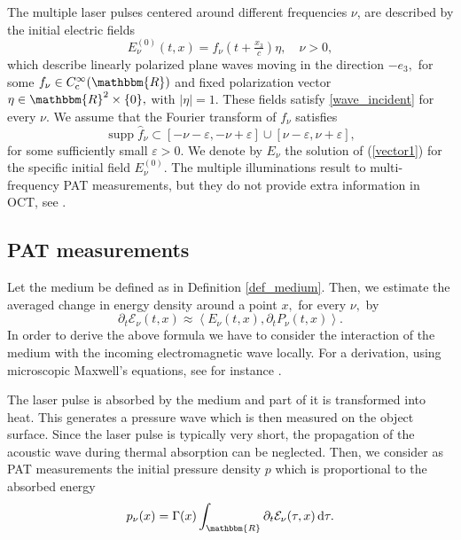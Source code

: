 \documentclass[a4paper,twoside,10pt]{article}
\theoremstyle{break}
\theoremstyle{nonumberplain}
\newcommand{\R}{\mathbbm{R}}
\renewcommand{\d}{\,\mathrm d}
\DeclareMathOperator{\supp}{supp}
\begin{document}
The  multiple laser pulses centered around different frequencies $\nu$, are described by the initial electric fields 
\begin{equation}\label{eqLocalisedPulse1}
E^{(0)}_\nu(t,x)=f_\nu(t+\tfrac{x_3}c)\eta, \quad \nu>0,
\end{equation}
which describe linearly polarized plane waves moving in the direction $-e_3 ,$  for some $f_\nu \in C^\infty_{\mathrm c}(\R)$ and fixed polarization vector $\eta\in\R^2\times\{0\},$ with $\vert\eta \vert =1.$ These fields satisfy \eqref{wave_incident} for every $\nu$.
We assume that the Fourier transform of $f_\nu$ satisfies
\begin{equation}\label{eqLocalisedPulse}
\supp\hat f_\nu\subset[-\nu-\varepsilon,-\nu+\varepsilon]\cup[\nu-\varepsilon,\nu+\varepsilon] ,
\end{equation}
for some sufficiently small $\varepsilon>0$. We denote by $E_\nu$ the solution of (\ref{vector1}) for the specific initial field $E^{(0)}_\nu .$
The multiple illuminations result to multi-frequency PAT measurements, but they do not provide extra information in OCT, see \cite[Lemma 3.6]{ElbMinSch17}. 


\subsection{PAT measurements}

Let the medium be defined as in Definition \ref{def_medium}. 
Then, we estimate the averaged change in energy density around a point $x,$ for every $\nu,$ by 
\begin{equation}\label{eqAbsorbedEnergy}
\partial_t\mathcal E_\nu (t,x) \approx \left<E_\nu(t,x),\partial_t  P_\nu (t,x)\right>.
\end{equation}
In order to derive the above formula we have to consider the interaction of the medium with the incoming electromagnetic wave locally. For a derivation, using microscopic Maxwell's equations, see for instance \cite[Section 4]{ElbMinSch17}.

The laser pulse is absorbed by the medium and part of it is transformed into heat. This generates a pressure wave which is then measured on the object surface. Since the laser pulse is typically very short, the propagation of the acoustic wave during thermal absorption can be neglected. Then,  we consider as PAT measurements the initial pressure density $p$ which is proportional to the absorbed energy
\begin{equation}\label{pat_data}
p_\nu(x) = \Gamma (x) \int_\R \partial_t\mathcal E_\nu (\tau ,x) \d \tau .
\end{equation}
\end{document}
